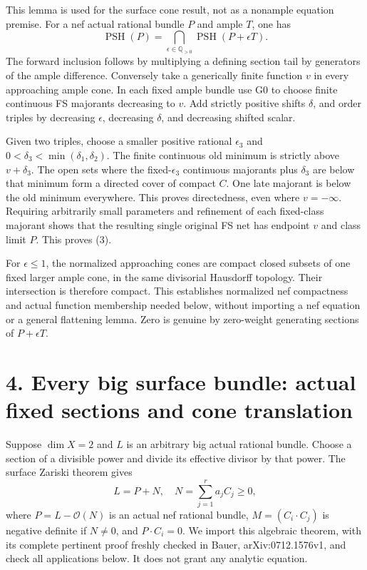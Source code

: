 \documentclass[
  10pt,
]{article}
\begin{document}
This lemma is used for the surface cone result, not as a nonample
equation premise. For a nef actual rational bundle \(P\) and ample
\(T\), one has
\[\operatorname{PSH}(P)=\bigcap_{\epsilon\in\mathbb Q_{>0}}
             \operatorname{PSH}(P+\epsilon T).                       \tag{3}\]
The forward inclusion follows by multiplying a defining section tail by
generators of the ample difference. Conversely take a generically finite
function \(v\) in every approaching ample cone. In each fixed ample
bundle use G0 to choose finite continuous FS majorants decreasing to
\(v\). Add strictly positive shifts \(\delta\), and order triples by
decreasing \(\epsilon\), decreasing \(\delta\), and decreasing shifted
scalar.

Given two triples, choose a smaller positive rational \(\epsilon_3\) and
\(0<\delta_3<\min(\delta_1,\delta_2)\). The finite continuous old
minimum is strictly above \(v+\delta_3\). The open sets where the
fixed-\(\epsilon_3\) continuous majorants plus \(\delta_3\) are below
that minimum form a directed cover of compact \(C\). One late majorant
is below the old minimum everywhere. This proves directedness, even
where \(v=-\infty\). Requiring arbitrarily small parameters and
refinement of each fixed-class majorant shows that the resulting single
original FS net has endpoint \(v\) and class limit \(P\). This proves
(3).

For \(\epsilon\le1\), the normalized approaching cones are compact
closed subsets of one fixed larger ample cone, in the same divisorial
Hausdorff topology. Their intersection is therefore compact. This
establishes normalized nef compactness and actual function membership
needed below, without importing a nef equation or a general flattening
lemma. Zero is genuine by zero-weight generating sections of
\(P+\epsilon T\).

\section{4. Every big surface bundle: actual fixed sections and cone
translation}\label{every-big-surface-bundle-actual-fixed-sections-and-cone-translation}

Suppose \(\dim X=2\) and \(L\) is an arbitrary big actual rational
bundle. Choose a section of a divisible power and divide its effective
divisor by that power. The surface Zariski theorem gives
\[L=P+N,\quad N=\sum_{j=1}^r a_jC_j\ge0,\] where \(P=L-\mathcal O(N)\)
is an actual nef rational bundle, \(M=(C_i\cdot C_j)\) is negative
definite if \(N\ne0\), and \(P\cdot C_i=0\). We import this algebraic
theorem, with its complete pertinent proof freshly checked in Bauer,
arXiv:0712.1576v1, and check all applications below. It does not grant
any analytic equation.
\end{document}

